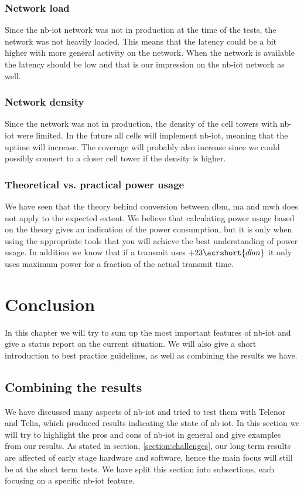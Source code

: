 \documentclass[USenglish]{ifimaster}  %
\begin{document}
\subsection{Network load}
Since the \acrshort{nb-iot} network was not in production at the time of the tests, the network was not heavily loaded. This means that the latency could be a bit higher with more general activity on the network. When the network is available the latency should be low and that is our impression on the \acrshort{nb-iot} network as well.

\subsection{Network density}
Since the network was not in production, the density of the cell towers with \acrshort{nb-iot} were limited. In the future all cells will implement \acrshort{nb-iot}, meaning that the uptime will increase. The coverage will probably also increase since we could possibly connect to a closer cell tower if the density is higher.

\subsection{Theoretical vs. practical power usage}
We have seen that the theory behind conversion between \acrshort{dbm}, \acrshort{ma} and \acrshort{mwh} does not apply to the expected extent. We believe that calculating power usage based on the theory gives an indication of the power consumption, but it is only when using the appropriate tools that you will achieve the best understanding of power usage. In addition we know that if a transmit uses ${+23 \acrshort{dbm}}$ it only uses maximum power for a fraction of the actual transmit time.

\chapter{Conclusion}                     %
In this chapter we will try to sum up the most important features of \acrshort{nb-iot} and give a status report on the current situation. We will also give a short introduction to best practice guidelines, as well as combining the results we have.

\section{Combining the results}
We have discussed many aspects of \acrshort{nb-iot} and tried to test them with Telenor and Telia, which produced results indicating the state of \acrshort{nb-iot}. In this section we will try to highlight the pros and cons of \acrshort{nb-iot} in general and give examples from our results. As stated in section, \vref{section:challenges}, our long term results are affected of early stage hardware and software, hence the main focus will still be at the short term tests. We have split this section into subsections, each focusing on a specific \acrshort{nb-iot} feature.
\end{document}
